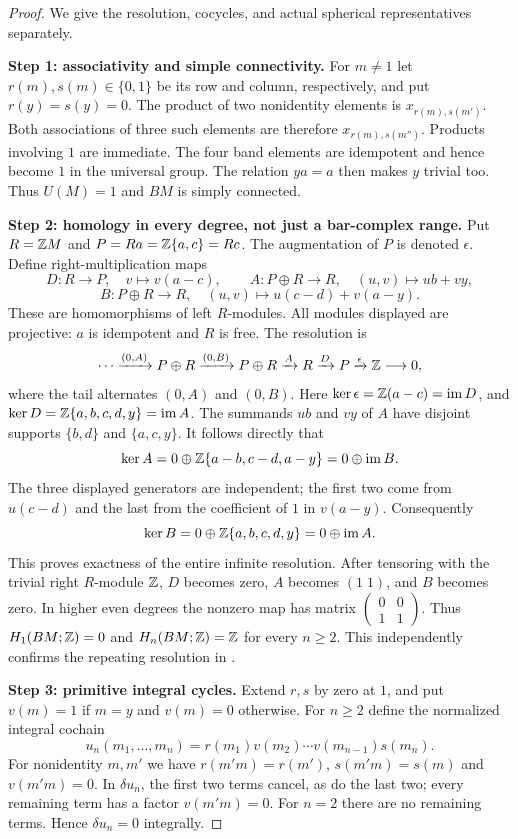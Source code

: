 \begin{proof}
We give the resolution, cocycles, and actual spherical representatives separately.

\textbf{Step 1: associativity and simple connectivity.}
For $m\ne1$ let $r(m),s(m)\in\{0,1\}$ be its row and column,
respectively, and put $r(y)=s(y)=0$. The product of two nonidentity
elements is $x_{r(m),s(m')}$. Both associations of three such elements
are therefore $x_{r(m),s(m'')}$. Products involving $1$ are immediate.
The four band elements are idempotent and hence become $1$ in the
universal group. The relation $ya=a$ then makes $y$ trivial too.
Thus $U(M)=1$ and $BM$ is simply connected.

\textbf{Step 2: homology in every degree, not just a bar-complex range.}
Put $R=\mathbb Z M$ and $P=Ra=\mathbb Z\{a,c\}=Rc$. The augmentation of $P$
is denoted $\epsilon$. Define right-multiplication maps
\[
 D:R\longrightarrow P,\quad v\longmapsto v(a-c),
 \qquad
 A:P\oplus R\longrightarrow R,\quad (u,v)\longmapsto ub+vy,
\]
\[
 B:P\oplus R\longrightarrow R,\quad
 (u,v)\longmapsto u(c-d)+v(a-y).
\]
These are homomorphisms of left $R$-modules. All modules displayed are
projective: $a$ is idempotent and $R$ is free. The resolution is
\[
 \cdots\xrightarrow{(0,A)}P\oplus R
 \xrightarrow{(0,B)}P\oplus R
 \xrightarrow{A}R\xrightarrow{D}P
 \xrightarrow{\epsilon}\mathbb Z\longrightarrow0,
\]
where the tail alternates $(0,A)$ and $(0,B)$.
Here $\ker\epsilon=\mathbb Z(a-c)=\operatorname{im}D$, and
$\ker D=\mathbb Z\{a,b,c,d,y\}=\operatorname{im}A$.
The summands $ub$ and $vy$ of $A$ have disjoint supports
$\{b,d\}$ and $\{a,c,y\}$. It follows directly that
\[
 \ker A=0\oplus\mathbb Z\{a-b,c-d,a-y\}=0\oplus\operatorname{im}B.
\]
The three displayed generators are independent; the first two come from
$u(c-d)$ and the last from the coefficient of $1$ in $v(a-y)$.
Consequently
\[
 \ker B=0\oplus\mathbb Z\{a,b,c,d,y\}=0\oplus\operatorname{im}A.
\]
This proves exactness of the entire infinite resolution. After tensoring
with the trivial right $R$-module $\mathbb Z$, $D$ becomes zero, $A$ becomes
$(1\;1)$, and $B$ becomes zero. In higher even degrees the nonzero
map has matrix $\left(\begin{smallmatrix}0&0\\1&1\end{smallmatrix}\right)$.
Thus $H_1(BM;\mathbb Z)=0$ and $H_n(BM;\mathbb Z)=\mathbb Z$ for every $n\ge2$.
This independently confirms the repeating resolution in
\cite[Example 5.2]{sweeney2025}.

\textbf{Step 3: primitive integral cycles.}
Extend $r,s$ by zero at $1$, and put $v(m)=1$ if $m=y$ and $v(m)=0$
otherwise. For $n\ge2$ define the normalized integral cochain
\[
 u_n(m_1,\ldots,m_n)
   =r(m_1)v(m_2)\cdots v(m_{n-1})s(m_n).
\]
For nonidentity $m,m'$ we have
$r(m'm)=r(m')$, $s(m'm)=s(m)$ and $v(m'm)=0$.
In $\delta u_n$, the first two terms cancel, as do the last two;
every remaining term has a factor $v(m'm)=0$. For $n=2$ there
are no remaining terms. Hence $\delta u_n=0$ integrally.


\end{proof}
